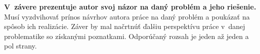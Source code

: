 \documentclass[../praca.tex]{subfiles}
\begin{document}
\textbf{V~závere prezentuje autor svoj názor na daný problém a jeho riešenie.}
Musí vyzdvihovať prínos návrhov autora práce na daný problém a poukázať na
spôsob ich realizácie. Záver by mal načrtnúť ďalšiu perspektívu práce v~danej
problematike so získanými poznatkami. Odporúčaný rozsah je jeden až jeden a pol
strany.
\end{document}
